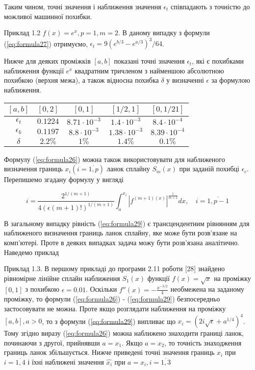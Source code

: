 \documentclass[ukrainian,14pt]{extarticle}
\begin{document}
Таким чином, точні значення і наближення значення $\epsilon_t$ співпадають з точністю до можливої машинної похибки.

\vspace{1cm}

Приклад 1.2 $f(x) = e^x, p = 1, m = 2$. В даному випадку з формули (\ref{eq:formula27}) отримуємо, $\epsilon_t = 9 (e^{b/3} - e^{a/3})^3 / 64$.

Нижче для деяких проміжків $[a, b]$ показані точні значення $\epsilon_t$, які є похибками наближення функції $e^x$ квадратним тричленом з найменшою абсолютною похибкою (верхня межа), а також відносна похибка $\delta$ у визначенні $\epsilon$ за формулою наближення.

\bgroup
\def\arraystretch{1.5}%
\begin{center}
\begin{tabular}{ c | c |
c | c | c }
 $[a, b]$ & $[0,2]$ & $[0,1]$ & $[1/2,1]$ & $[0,1/21]$ \\
 \hline
 $\epsilon_t$ & $0.1224$ & $8.71 \cdot 10^{-3}$ & $1.4 \cdot 10^{-3}$ & $8.4 \cdot 10^{-4}$ \\  
 \hline
  $\epsilon_b$ & $0.1197$ & $8.8 \cdot 10^{-3}$ & $1.38 \cdot 10^{-3}$ & $8.39 \cdot 10^{-4}$\\  
 \hline
 $\delta$ & $2.2\%$ & $1\%$ & $1.4\%$ & $0.1\%$    
\end{tabular}
\end{center}
\egroup

Формулу (\ref{eq:formula26}) можна також використовувати для наближеного визначення границь $x_i (i = \overline{1,p})$ ланок сплайну $S_m(x)$ при заданій похибці $\epsilon_c$. Перепишемо згадану формулу у вигляді

\begin{equation}\label{eq:formula29}
    i = \frac{2^{1/(m+1)}}{4(\epsilon (m+1)!)^{1/(m+1)}} \int_a^{x_i} \left| f^{(m+1) (x)} \right|^{\frac{1}{m+1}} dx, \quad i = \overline{1, p-1}
\end{equation}

В загальному випадку рівність (\ref{eq:formula29}) є трансцендентним рівнянням для наближеного визначення границь ланок сплайну, яке може бути розв'язане на комп'ютері. Проте в деяких випадках задача можу бути розв'язана аналітично. Наведемо приклад

Приклад 1.3. В першому прикладі до програми 2.11 роботи [28] знайдено рівномірне лінійне сплайн наближення $S_1(x)$ функції $f(x) = \sqrt{x}$ на проміжку $[0,1]$ з похибкою $\epsilon = 0.01$. Оскільки $f''(x) = -\frac{x^{-3/2}}{4}$ необмежена на заданому проміжку, то формули (\ref{eq:formula26}) - (\ref{eq:formula29}) безпосередньо застосовувати не можна. Проте якщо розглядати наближення на проміжку $[a, b], a > 0$, то з формули (\ref{eq:formula29}) випливає що $x_i = (2i \sqrt{\epsilon} + a^{1/4})^{4}$. Тому згідно виразу (\ref{eq:formula26}) можна наближено знаходити границі ланок, починаючи з другої, прийнявши $a = x_1$. Якщо $a = x_2$, то точність знаходження границь ланок збільшується. Нижче приведені точні значення границь $x_i$ при $i = \overline{1, 4}$ і їхні наближені значення $\hat{x_i}$ при $a = x_i, i = \overline{1,3}$
\end{document}
